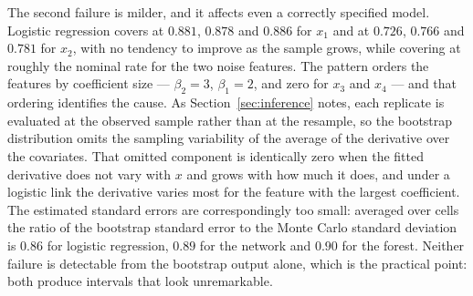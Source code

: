 \documentclass[12pt]{article}
\begin{document}
	The second failure is milder, and it affects even a correctly specified model. Logistic regression covers at $0.881$, $0.878$ and $0.886$ for $x_1$ and at $0.726$, $0.766$ and $0.781$ for $x_2$, with no tendency to improve as the sample grows, while covering at roughly the nominal rate for the two noise features. The pattern orders the features by coefficient size --- $\beta_2 = 3$, $\beta_1 = 2$, and zero for $x_3$ and $x_4$ --- and that ordering identifies the cause. As Section~\ref{sec:inference} notes, each replicate is evaluated at the observed sample rather than at the resample, so the bootstrap distribution omits the sampling variability of the average of the derivative over the covariates. That omitted component is identically zero when the fitted derivative does not vary with $x$ and grows with how much it does, and under a logistic link the derivative varies most for the feature with the largest coefficient. The estimated standard errors are correspondingly too small: averaged over cells the ratio of the bootstrap standard error to the Monte Carlo standard deviation is $0.86$ for logistic regression, $0.89$ for the network and $0.90$ for the forest. Neither failure is detectable from the bootstrap output alone, which is the practical point: both produce intervals that look unremarkable.
	
\end{document}

